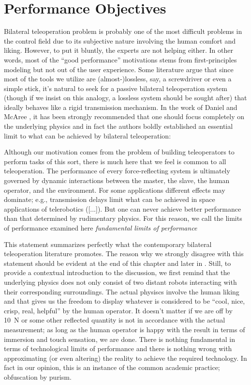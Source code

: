 \chapter{Performance Objectives}
\label{chap:perf}


Bilateral teleoperation problem is probably one of the most difficult problems in the control field due to its 
subjective nature involving the human comfort and liking. However, to put it bluntly, the experts are not helping 
either. In other words, most of the \enquote{good performance} motivations stems from first-principles modeling 
but not out of the user experience. 
Some literature argue that since most of the tools we utilize are (almost-)lossless, say, a 
screwdriver or even a simple stick, it's natural to seek for a passive bilateral teleoperation system (though if we
insist on this analogy, a lossless system should be sought after) that ideally behaves like a rigid transmission mechanism. In the work of 
Daniel and McAree \cite{danielmcaree}, it has been strongly recommended that one should focus completely on the underlying physics and in 
fact the authors boldly established an essential limit to what can be achieved by bilateral teleoperation:
\begin{displayquote}
Although our motivation comes from the problem of building teleoperators to perform tasks of this sort, there is much here that we feel is 
common to all teleoperation. The performance of every force-reflecting system is ultimately governed by dynamic interactions between the 
master, the slave, the human operator, and the environment. For some applications different effects may dominate; e.g., transmission delays
limit what can be achieved in space applications of telerobotics ([...]). But one can never achieve better performance than that determined 
by rudimentary physics. For this reason, we call the limits of performance examined here \emph{fundamental limits of performance}
\end{displayquote}
This statement summarizes perfectly what the contemporary bilateral teleoperation literature promotes. The reason why we strongly 
disagree with this statement should be evident at the end of this chapter and later in . Still, to provide a contextual 
introduction to the discussion, we first remind that the underlying physics does not only consist of two distant robots interacting with 
their corresponding surroundings. The actual physiscs involve the human liking and that gives us the freedom to display whatever is considered 
to be \enquote{cool, nice, crisp, real, helpful} by the human operator. It doesn't matter if we are off by \SI{10}{\newton} or some other reflected 
quantity is not in accordance with the actual measurement; as long as the human operator is happy with the result in terms of immersion and 
touch sensation, we are done. There is nothing fundamental in terms of technological limits of performance and there is nothing wrong with 
approximating (or even altering) the reality to achieve the required technology. In fact in our opinion, this is an instance of the common academic 
practice; obfuscation by purism.

